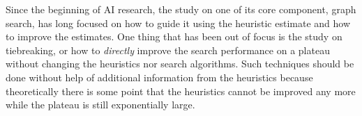 Since the beginning of AI research, the study on one of its core
component, graph search, has long focused on how to guide it using the
heuristic estimate and how to improve the estimates.  One thing that has
been out of focus is the study on tiebreaking, or how to \emph{directly}
improve the search performance on a plateau without changing the
heuristics nor search algorithms.  Such techniques should be done
without help of additional information from the heuristics because
theoretically there is some point that the heuristics cannot be improved
any more while the plateau is still exponentially large.
